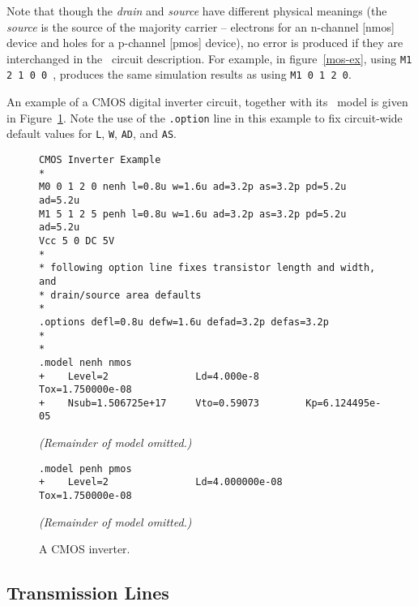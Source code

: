 Note that though the {\it drain} and {\it source}
have different physical meanings
(the {\it source} is the source of the majority carrier -- electrons for
an n-channel [nmos] device and holes for a p-channel [pmos] device),
no error is produced if they are interchanged in the \spice\
circuit description.
For example, in figure~\ref{mos-ex}, using {\tt M1 2 1 0 0 },
produces the same simulation results as using {\tt M1 0 1 2 0}.

An example of a CMOS digital inverter circuit,
together with its \spice\ model is given
in Figure~\ref{cmos-ex}.
Note the use of the {\tt .option} line in this example to fix
circuit-wide default values for {\tt L}, {\tt W}, {\tt AD}, and {\tt AS}.
%
\begin{figure}[h]
\centerline{}
\par\noindent
{\tt \begin{verbatim}
CMOS Inverter Example
*
M0 0 1 2 0 nenh l=0.8u w=1.6u ad=3.2p as=3.2p pd=5.2u ad=5.2u
M1 5 1 2 5 penh l=0.8u w=1.6u ad=3.2p as=3.2p pd=5.2u ad=5.2u
Vcc 5 0 DC 5V
*
* following option line fixes transistor length and width, and
* drain/source area defaults
*
.options defl=0.8u defw=1.6u defad=3.2p defas=3.2p
*
*
.model nenh nmos
+    Level=2               Ld=4.000e-8        Tox=1.750000e-08
+    Nsub=1.506725e+17     Vto=0.59073        Kp=6.124495e-05
\end{verbatim}
\par\noindent
{\em (Remainder of model omitted.)}
\begin{verbatim}
.model penh pmos
+    Level=2               Ld=4.000000e-08    Tox=1.750000e-08
\end{verbatim} }
\par\noindent
{\em (Remainder of model omitted.)}
\caption{A CMOS inverter.}
\label{cmos-ex}
\end{figure}
%

\subsection{Transmission Lines}

